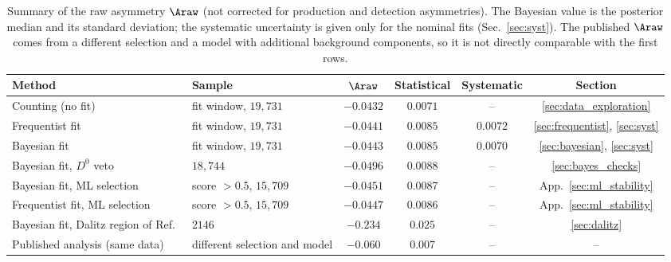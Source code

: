 \begin{table}[t]
\centering
\begin{tabular}{llcccc}
\toprule
Method & Sample & $\Araw$ & Statistical & Systematic & Section \\
\midrule
Counting (no fit) & fit window, $19{,}731$ & $-0.0432$ & $0.0071$ & -- & \ref{sec:data_exploration} \\
Frequentist fit & fit window, $19{,}731$ & $-0.0441$ & $0.0085$ & $0.0072$ & \ref{sec:frequentist}, \ref{sec:syst} \\
Bayesian fit & fit window, $19{,}731$ & $-0.0443$ & $0.0085$ & $0.0070$ & \ref{sec:bayesian}, \ref{sec:syst} \\
Bayesian fit, $D^0$ veto & $18{,}744$ & $-0.0496$ & $0.0088$ & -- & \ref{sec:bayes_checks} \\
Bayesian fit, ML selection & score $>0.5$, $15{,}709$ & $-0.0451$ & $0.0087$ & -- & App.~\ref{sec:ml_stability} \\
Frequentist fit, ML selection & score $>0.5$, $15{,}709$ & $-0.0447$ & $0.0086$ & -- & App.~\ref{sec:ml_stability} \\
Bayesian fit, Dalitz region of Ref.~\cite{lhcb_cpv_2013} & $2146$ & $-0.234$ & $0.025$ & -- & \ref{sec:dalitz} \\
\midrule
Published analysis (same data)~\cite{lhcb_cpv_2013} & different selection and model & $-0.060$ & $0.007$ & -- & -- \\
\bottomrule
\end{tabular}
\caption{Summary of the raw asymmetry $\Araw$ (not corrected for production and detection asymmetries). The Bayesian value is the posterior median and its standard deviation; the systematic uncertainty is given only for the nominal fits (Sec.~\ref{sec:syst}). The published $\Araw$ comes from a different selection and a model with additional background components, so it is not directly comparable with the first rows.}
\label{tab:summary}
\end{table}
